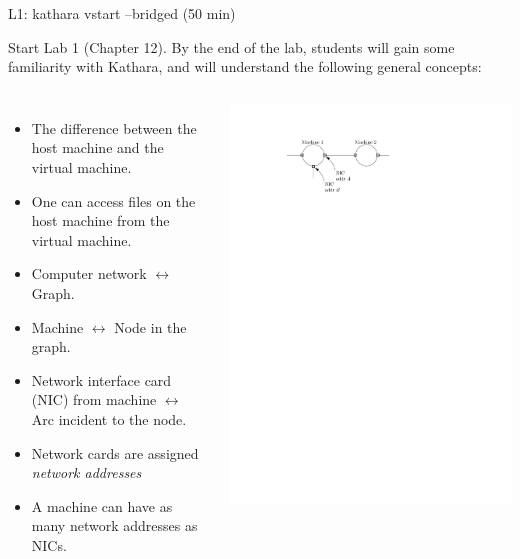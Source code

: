 \documentclass[aspectratio=1610]{beamer}
\begin{document}

\begin{frame}[plain,t]{L1: kathara vstart --bridged (50 min)}

  Start Lab 1 (Chapter 12). By the end of the lab, students will gain some familiarity with Kathara, and will understand the following general concepts:

  \begin{columns}
    \begin{itemize}
    \item The difference between the host machine and the virtual machine.
    \item One can access files on the host machine from the virtual machine.
    \item Computer network $\leftrightarrow$ Graph.
    \item Machine $\leftrightarrow$ Node in the graph.
    \item Network interface card (NIC) from machine $\leftrightarrow$ Arc incident to the node.
    \item Network cards are assigned \emph{network addresses}
    \item A machine can have as many network addresses as NICs.
    \end{itemize}

    \includegraphics[page=1,scale=0.7]{n4l1-001.pdf}
  \end{columns}
\end{frame}
  
\end{document}
